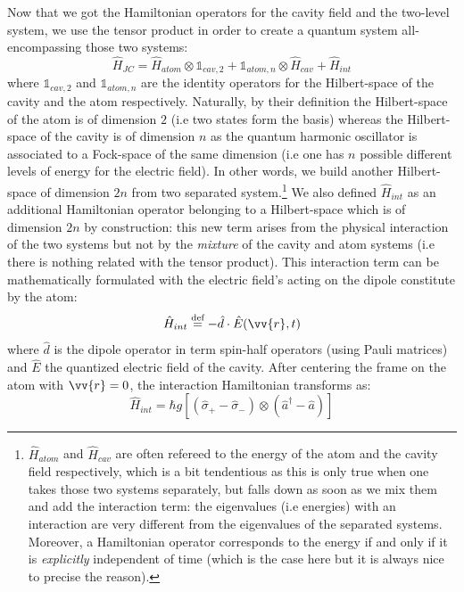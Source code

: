 \documentclass[11pt]{report}
\begin{document}
Now that we got the Hamiltonian operators for the cavity field and the two-level system, we use the tensor product in order to create a quantum system all-encompassing those two systems:
\begin{equation}
\hat{H}_{JC} = \hat{H}_{atom} \otimes \mathbb{1}_{cav,2} + \mathbb{1}_{atom,n} \otimes \hat{H}_{cav} + \hat{H}_{int}
\end{equation}
where $\mathbb{1}_{cav,2}$ and $\mathbb{1}_{atom,n}$ are the identity operators for the Hilbert-space of the cavity and the atom respectively. Naturally, by their definition the Hilbert-space of the atom is of dimension $2$ (i.e two states form the basis) whereas the Hilbert-space of the cavity is of dimension $n$ as the quantum harmonic oscillator is associated to a Fock-space of the same dimension (i.e one has $n$ possible different levels of energy for the electric field). In other words, we build another Hilbert-space of dimension $2n$ from two separated system.\footnote{$\hat{H}_{atom}$ and $\hat{H}_{cav}$ are often refereed to the energy of the atom and the cavity field respectively, which is a bit tendentious as this is only true when one takes those two systems separately, but falls down as soon as we mix them and add the interaction term: the eigenvalues (i.e energies) with an interaction are very different from the eigenvalues of the separated systems. Moreover, a Hamiltonian operator corresponds to the energy if and only if it is \textit{explicitly} independent of time (which is the case here but it is always nice to precise the reason).} We also defined $\hat{H}_{int}$ as an additional Hamiltonian operator belonging to a Hilbert-space which is of dimension $2n$ by construction: this new term arises from the physical interaction of the two systems but not by the \textit{mixture} of the cavity and atom systems (i.e there is nothing related with the tensor product). This interaction term can be mathematically formulated with the electric field's acting on the dipole constitute by the atom:
\begin{equation}
\hat{H}_{int}  \stackrel{\text{def}}{=} -\hat{d}\cdot\hat{E}(\vv{r}, t)
\end{equation}
where $\hat{d}$ is the dipole operator in term spin-half operators (using Pauli matrices) and $\hat{E}$ the quantized electric field of the cavity. After centering the frame on the atom with $\vv{r} = 0$, the interaction Hamiltonian transforms as:
\begin{equation}
\hat{H}_{int} = \hbar g \left[ (\hat{\sigma}_+ - \hat{\sigma}_-) \otimes (\hat{a}^\dag - \hat{a})\right]
\end{equation}
\end{document}
